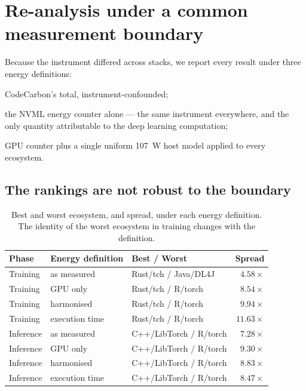 \section{Re-analysis under a common measurement boundary}
\label{sec:reanalysis}

Because the instrument differed across stacks, we report every result under three
energy definitions:

\begin{description}\itemsep2pt
  \item[as measured] CodeCarbon's total, instrument-confounded;
  \item[GPU only] the NVML energy counter alone --- the same instrument
        everywhere, and the only quantity attributable to the deep learning
        computation;
  \item[harmonised] GPU counter plus a single uniform \SI{107}{\watt} host model
        applied to every ecosystem.
\end{description}

\subsection{The rankings are not robust to the boundary}

\begin{table}[t]
\centering
\caption{Best and worst ecosystem, and spread, under each energy definition. The
identity of the worst ecosystem in training changes with the definition.}
\label{tab:spreads}
\small
\begin{tabular}{lllr}
\toprule
Phase & Energy definition & Best / Worst & Spread \\
\midrule
Training & as measured    & Rust/tch / Java/DL4J & \(4.58\times\) \\
Training & GPU only       & Rust/tch / R/torch   & \(8.54\times\) \\
Training & harmonised     & Rust/tch / R/torch   & \(9.94\times\) \\
Training & execution time & Rust/tch / R/torch   & \(11.63\times\) \\
\midrule
Inference & as measured    & C++/LibTorch / R/torch & \(7.28\times\) \\
Inference & GPU only       & C++/LibTorch / R/torch & \(9.30\times\) \\
Inference & harmonised     & C++/LibTorch / R/torch & \(8.83\times\) \\
Inference & execution time & C++/LibTorch / R/torch & \(8.47\times\) \\
\bottomrule
\end{tabular}
\end{table}

